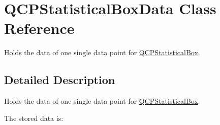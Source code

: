 \hypertarget{class_q_c_p_statistical_box_data}{}\section{Q\+C\+P\+Statistical\+Box\+Data Class Reference}
\label{class_q_c_p_statistical_box_data}


Holds the data of one single data point for \mbox{\hyperlink{class_q_c_p_statistical_box}{Q\+C\+P\+Statistical\+Box}}.  




\subsection{Detailed Description}
Holds the data of one single data point for \mbox{\hyperlink{class_q_c_p_statistical_box}{Q\+C\+P\+Statistical\+Box}}. 

The stored data is\+:


